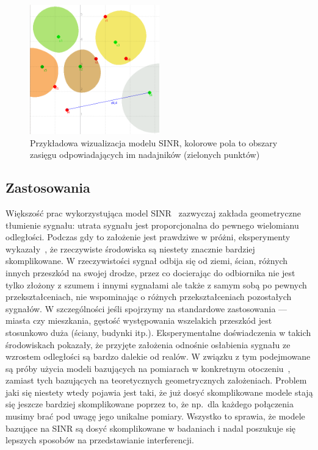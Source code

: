 \documentclass[11pt,a4paper,onecolumn,twoside]{mwart}
\begin{document}
\begin{center}
    \begin{figure}[!ht]
        \begin{center}
            \includegraphics[width=0.5\textwidth]{pictures/model.png}
            \caption{Przykładowa wizualizacja modelu SINR, kolorowe pola to
                    obszary zasięgu odpowiadających im nadajników (zielonych
                    punktów)}
        \end{center}
    \end{figure}
\end{center}

\subsection{Zastosowania}
Większość prac wykorzystująca model SINR~\cite{Gupta:2006:CWN:2263214.2266070,
Moscibroda06thecomplexity} zazwyczaj zakłada geometryczne tłumienie
sygnału: utrata sygnału jest proporcjonalna do pewnego wielomianu odległości.
Podczas gdy to założenie jest prawdziwe w próżni, eksperymenty
wykazały~\cite{Baccour:2012:RLQ:2240116.2240123}, że rzeczywiste środowiska
są niestety znacznie bardziej skomplikowane. W rzeczywistości sygnał odbija się
od ziemi, ścian, różnych innych przeszkód na swojej drodze, przez co docierając
do odbiornika nie jest tylko  złożony z szumem i innymi sygnałami ale także
z samym sobą po pewnych przekształceniach, nie wspominając o różnych
przekształceniach pozostałych sygnałów. W szczególności jeśli spojrzymy na
standardowe zastosowania --- miasta czy mieszkania, gęstość występowania
wszelakich przeszkód jest stosunkowo duża (ściany, budynki itp.).
Eksperymentalne doświadczenia w takich środowiskach pokazały, że przyjęte
założenia odnośnie osłabienia sygnału ze wzrostem odległości są bardzo dalekie
od realów. W związku z tym podejmowane są próby użycia modeli bazujących na
pomiarach w konkretnym otoczeniu~\cite{Reis:2006:MMD:1151659.1159921,
DBLP:journals/corr/GudmundsdottirABFHJUV14}, zamiast tych bazujących na
teoretycznych geometrycznych założeniach. Problem jaki się niestety wtedy
pojawia jest taki, że już dosyć skomplikowane modele stają się jeszcze bardziej
skomplikowane poprzez to, że np.\ dla każdego połączenia musimy brać pod uwagę
jego unikalne pomiary. Wszystko to sprawia, że modele bazujące na SINR są dosyć
skomplikowane w badaniach i nadal poszukuje się lepszych sposobów na
przedstawianie interferencji.
\end{document}
